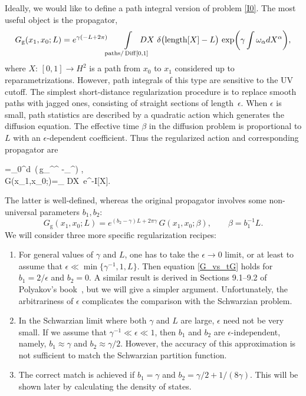 \documentclass[12pt]{article}
\newcommand*{\widebox}[1]{\setlength{\fboxsep}{1ex}%
  \fbox{#1}}
\DeclareMathOperator{\Diff}{Diff}
\DeclareMathOperator{\HH}{H}
\DeclareMathOperator{\len}{length}
\newcommand{\g}{\text{g}}
\def\HH{H}
\begin{document}
Ideally, we would like to define a path integral version of problem \eqref{I0}. The most useful object is the propagator,
\begin{equation}\label{prop_I0}
G_{\g}(x_1,x_0;L)=
e^{\gamma(-L+2\pi)}\!\!\int\limits_{\text{paths}/\Diff[0,1]}\hspace{-0.5cm}
DX\,\,\delta\bigl(\len[X]-L\bigr)\,
\exp\biggl(\gamma\int\omega_{\alpha}dX^{\alpha}\biggr),
\end{equation}
where $X:\,[0,1]\to \HH^2$ is a path from $x_0$ to $x_1$ considered up to reparametrizations. However, path integrals of this type are sensitive to the UV cutoff. The simplest short-distance regularization procedure is to replace smooth paths with jagged ones, consisting of straight sections of length~$\epsilon$. When $\epsilon$ is small, path statistics are described by a quadratic action which generates the diffusion equation. The effective time $\beta$ in the diffusion problem is proportional to $L$ with an $\epsilon$-dependent coefficient. Thus the regularized action and corresponding propagator are
\begin{empheq}[box=\widebox]{gather}
\label{tI}
I[X]=\int_{0}^{\beta}d\tau\, 
\left(\,g_{\alpha\beta}^{\alpha}^{\beta}
-\gamma\omega_{\alpha}^{\alpha}\right) ,
\\[5pt]
G(x_1,x_0;\beta)=\int_{} DX\, e^{-I[X]}.
\end{empheq}
The latter is well-defined, whereas the original propagator involves some non-universal parameters $b_1,b_2$:
\begin{equation}\label{G_vs_tG}
G_{\g}(x_1,x_0;L)=e^{(b_{2}-\gamma)L+2\pi\gamma}\,G(x_1,x_0;\beta),\qquad
\beta=b_1^{-1}L.
\end{equation}
We will consider three more specific regularization recipes:
\begin{enumerate}
\item \label{reg1} For general values of $\gamma$ and $L$, one has to take the $\epsilon\to 0$ limit, or at least to assume that $\epsilon\ll\min\{\gamma^{-1},1,L\}$. Then equation \eqref{G_vs_tG} holds for $b_1=2/\epsilon$ and $b_2=0$. A similar result is derived in Sections 9.1--9.2 of Polyakov's book~\cite{Polyakov}, but we will give a simpler argument. Unfortunately, the arbitrariness of $\epsilon$ complicates the comparison with the Schwarzian problem.
\item \label{reg2} In the Schwarzian limit where both $\gamma$ and $L$ are large, $\epsilon$ need not be very small. If we assume that $\gamma^{-1}\ll\epsilon\ll 1$, then $b_1$ and $b_2$ are $\epsilon$-independent, namely, $b_1\approx\gamma$ and $b_2\approx\gamma/2$. However, the accuracy of this approximation is not sufficient to match the Schwarzian partition function.
\item \label{reg3} The correct match is achieved if $b_1=\gamma$ and $b_2=\gamma/2+1/(8\gamma)$. This will be shown later by calculating the density of states.
\end{enumerate}
\end{document}
